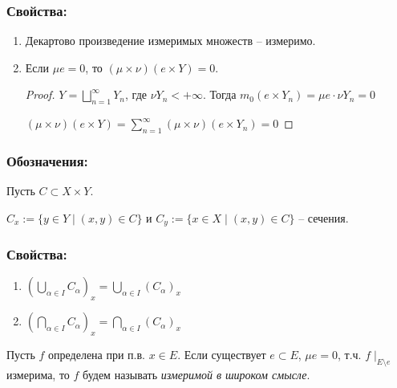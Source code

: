 \subsubsection*{Свойства:}

\begin{enumerate}
    \item Декартово произведение измеримых множеств – измеримо.
    
    \item Если $\mu e = 0$, то $(\mu\times\nu)(e\times Y)=0$.
    
    \begin{proof}
        $Y=\bigsqcup\limits_{n=1}^\infty Y_n$, где $\nu Y_n <+\infty$. Тогда $m_0 (e\times Y_n) = \mu e\cdot \nu Y_n=0$

        $(\mu \times \nu) (e\times Y)=\sum\limits_{n=1}^\infty (\mu \times \nu) (e \times Y_n)=0$
    \end{proof}
\end{enumerate}

\subsubsection*{Обозначения:}

Пусть $C\subset X\times Y$. 

$C_x := \{y\in Y \mid (x, y)\in C\}$ и $C_y := \{x\in X \mid (x, y)\in C\}$ – сечения.

\subsubsection*{Свойства:}

\begin{enumerate}
    \item $(\bigcup\limits_{\alpha \in I} C_\alpha)_x =\bigcup\limits_{\alpha \in I} (C_\alpha)_x$
    
    \item $(\bigcap\limits_{\alpha \in I} C_\alpha)_x =\bigcap\limits_{\alpha \in I} (C_\alpha)_x$
\end{enumerate}

\begin{definition}
    Пусть $f$ определена при п.в. $x\in E$. Если существует $e\subset E$, $\mu e = 0$, т.ч. $f\mid_{E\setminus e}$
    измерима, то $f$ будем называть \textit{измеримой в широком смысле}.
\end{definition}

